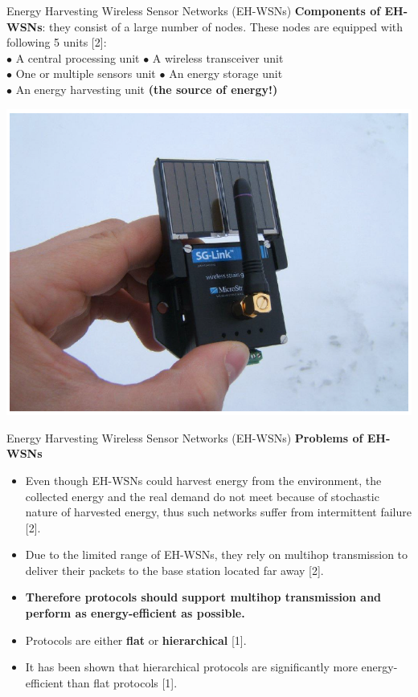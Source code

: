 \documentclass{beamer}
\begin{document}
\begin{frame}[t]{Energy Harvesting Wireless Sensor Networks (EH-WSNs)} %
\textbf{Components of EH-WSNs}: 
\small
they consist of a large number of nodes. These nodes are equipped with following 5 units [2]:\\
$\bullet$ A central processing unit \hspace{25pt} $\bullet$ A wireless transceiver unit \\
$\bullet$ One or multiple sensors unit \hspace{11pt} $\bullet$ An energy storage unit \\
$\bullet$ An energy harvesting unit \textbf{(the source of energy!)}
\begin{center}
\includegraphics[scale=0.3]{figure/NodeFig}
\end{center}
\end{frame}



\begin{frame}[t]{Energy Harvesting Wireless Sensor Networks (EH-WSNs)} %
\textbf{Problems of EH-WSNs}
\small
\begin{itemize}
\justifying
\item Even though EH-WSNs could harvest energy from the environment, the collected energy and the real demand do not meet because of stochastic nature of harvested energy, thus such networks suffer from intermittent failure [2].
\item Due to the limited range of EH-WSNs, they rely on multihop transmission to deliver their packets to the base station located far away [2].
\item \textbf{Therefore protocols should support multihop transmission and perform as energy-efficient as possible.}
\item Protocols are either \textbf{flat} or \textbf{hierarchical} [1].
\item It has been shown that hierarchical protocols are significantly more energy-efficient than flat protocols [1].
\end{itemize}
\end{frame}
\end{document}
